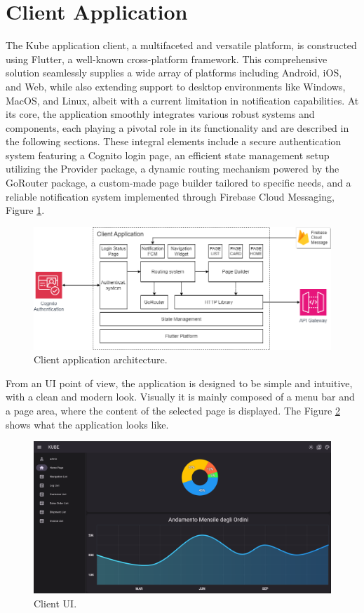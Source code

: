 \section{Client Application}
The Kube application client, a multifaceted and versatile platform, is constructed using Flutter, a
well-known cross-platform framework. This comprehensive solution seamlessly supplies a wide array of
platforms including Android, iOS, and Web, while also extending support to desktop environments like
Windows, MacOS, and Linux, albeit with a current limitation in notification capabilities. At its
core, the application smoothly integrates various robust systems and components, each playing a
pivotal role in its functionality and are described in the following sections. These integral
elements include a secure authentication system featuring a Cognito login page, an efficient state
management setup utilizing the Provider package, a dynamic routing mechanism powered by the GoRouter
package, a custom-made page builder tailored to specific needs, and a reliable notification system
implemented through Firebase Cloud Messaging, Figure \ref{fig:5_client_application}.

\begin{figure}
    \centering
    \includegraphics[scale=0.45]{Pictures/5_client.png}
    \caption{Client application architecture.}
    \label{fig:5_client_application}
\end{figure}

From an UI point of view, the application is designed to be simple and intuitive, with a clean and
modern look. Visually it is mainly composed of a menu bar and a page area, where the content of the
selected page is displayed. The Figure \ref{fig:5_client_UI} shows what the application
looks like.

\begin{figure}
    \centering
    \includegraphics[scale=0.35]{Pictures/5_client_ui.png}
    \caption{Client UI.}
    \label{fig:5_client_UI}
\end{figure}

